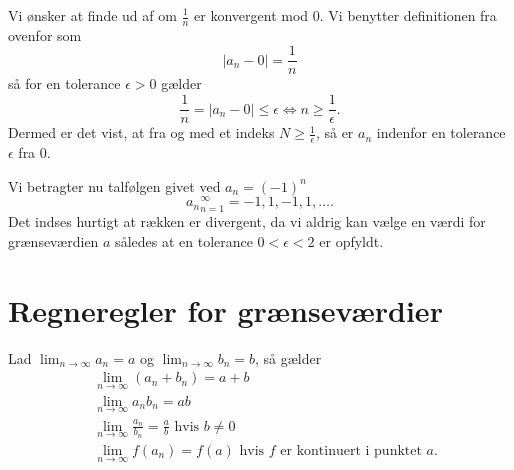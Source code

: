 \begin{eks} 
  Vi ønsker at finde ud af om $\frac{1}{n}$ er konvergent mod 0. \bigbreak
  Vi benytter definitionen fra ovenfor som
  \[ 
  |a_n - 0| = \frac{1}{n}
  \]
  så for en tolerance $\epsilon > 0$ gælder
  \[ 
  \frac{1}{n} = |a_n - 0| \leq \epsilon \iff n \geq \frac{1}{\epsilon}
  .\]
  Dermed er det vist, at fra og med et indeks $N \geq \frac{1}{\epsilon}$, så er $a_n$ indenfor en tolerance $\epsilon$ fra 0.
\end{eks}

\begin{eks} 
  Vi betragter nu talfølgen givet ved $a_n = (-1)^{n}$
  \[ 
    {a_n}_{n = 1}^{\infty} = -1, 1, -1, 1, \ldots 
  .\]
  Det indses hurtigt at rækken er divergent, da vi aldrig kan vælge en værdi for grænseværdien $a$ således at en tolerance $0 < \epsilon < 2$ er opfyldt.
\end{eks}



\section{Regneregler for grænseværdier}
\begin{sæt} 
  Lad $\lim_{n \to \infty} a_n = a$ og $\lim_{n \to \infty} b_n = b$, så gælder
  \begin{align*}
  &\lim_{n \to \infty} (a_n + b_n) = a+b \\
  &\lim_{n \to \infty} a_{n} b_{n} = ab \\
  &\lim_{n \to \infty} \frac{a_n}{b_n} = \frac{a}{b} \text{ hvis } b \neq 0 \\
  &\lim_{n \to \infty} f(a_{n}) = f(a) \text{ hvis $f$ er kontinuert i punktet $a$}
  .\end{align*}
\end{sæt}

